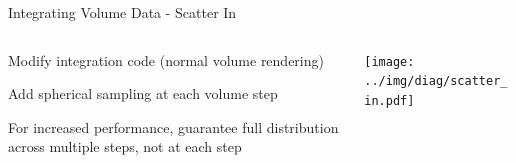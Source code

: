 \documentclass[10pt,compress,professionalfont]{beamer}
\begin{document}
\begin{frame}{Integrating Volume Data - Scatter In}

    \begin{columns}
        \begin{column}{0.5\textwidth}

            Modify integration code (normal volume rendering)\\
            \vspace{8mm}

            Add spherical sampling at each volume step\\
            \vspace{8mm}

            For increased performance, guarantee full distribution across multiple steps, not at each step

        \end{column}
        \begin{column}{0.5\textwidth}
            \texttt{[image: ../img/diag/scatter\_in.pdf]}\\
        \end{column}
    \end{columns}

\end{frame}
\end{document}

